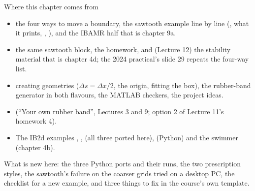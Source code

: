 \documentclass[aspectratio=169,11pt]{beamer}
\begin{document}
\begin{frame}{Where this chapter comes from}
\label{fr:sources}
\footnotesize
\begin{itemize}
  \item {} the four ways to move a boundary, the sawtooth example line by line (, what it prints, , ), and the IBAMR half that is chapter 9a.
  \item {} the same sawtooth block, the homework, and (Lecture 12) the stability material that is chapter 4d; the 2024 practical's slide 29 repeats the four-way list.
  \item {} creating geometries ($\Delta s = \Delta x/2$, the origin, fitting the box), the rubber-band generator in both flavours, the MATLAB checkers, the project ideas.
  \item {} (``Your own rubber band'', Lectures 3 and 9; option 2 of Lecture 11's homework 4).
  \item The IB2d examples , ,  (all three ported here),  (Python) and the swimmer (chapter 4b).
\end{itemize}
What is new here: the three Python ports and their runs, the two prescription styles, the sawtooth's failure on the coarser grids tried on a desktop PC, the checklist for a new example, and three things to fix in the course's own template.
\end{frame}
\end{document}
